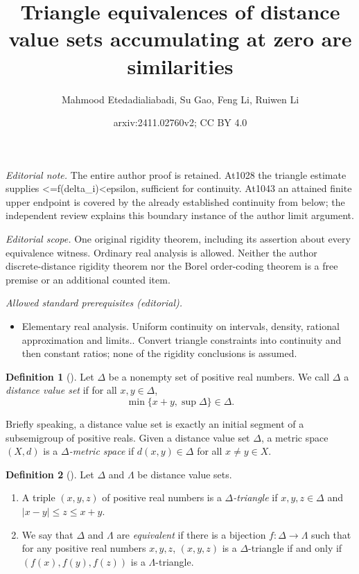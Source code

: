 \documentclass[10pt,a4paper]{amsart}
\title{Triangle equivalences of distance value sets accumulating at zero are similarities}
\author{Mahmood Etedadialiabadi, Su Gao, Feng Li, Ruiwen Li}
\date{arxiv:2411.02760v2; CC BY 4.0}
\theoremstyle{definition}
\newtheorem{definition}{Definition}[section]
\theoremstyle{remark}
\begin{document}
\maketitle
\noindent\textit{Editorial note.} The entire author proof is retained. At1028 the triangle estimate supplies <=f(delta\_i)<epsilon, sufficient for continuity. At1043 an attained finite upper endpoint is covered by the already established continuity from below; the independent review explains this boundary instance of the author limit argument.\par\medskip
\noindent\textit{Editorial scope.} One original rigidity theorem, including its assertion about every equivalence witness. Ordinary real analysis is allowed. Neither the author discrete-distance rigidity theorem nor the Borel order-coding theorem is a free premise or an additional counted item.\par\medskip
\noindent\textit{Allowed standard prerequisites (editorial).}\begin{itemize}
\item Elementary real analysis. Uniform continuity on intervals, density, rational approximation and limits.. Convert triangle constraints into continuity and then constant ratios; none of the rigidity conclusions is assumed.
\end{itemize}\medskip
    \begin{definition}[\cite{EGLMM}]
        Let $\Delta$ be a nonempty set of positive real numbers. We call $\Delta$ a {\em distance value set} if for all $x, y\in \Delta$, 
        \begin{equation*}
           \min\{ x+y, \sup\Delta\} \in \Delta.
        \end{equation*}
    \end{definition}
Briefly speaking, a distance value set is exactly an initial segment of a subsemigroup of positive reals. Given a distance value set $\Delta$, a metric space $(X,d)$ is a {\em $\Delta$-metric space} if $d(x,y)\in\Delta$ for all $x\neq y\in X$. 

\begin{definition}[\cite{EGLMM}]\label{def:CDVSequiv} Let $\Delta$ and $\Lambda$ be distance value sets. 
\begin{enumerate}
\item[(i)] A triple $(x,y,z)$ of positive real numbers is a {\em $\Delta$-triangle} if $x,y, z\in \Delta$ and $|x-y|\leq z\leq x+y$.
\item[(ii)] We say that $\Delta$ and $\Lambda$ are {\em equivalent} if there is a bijection $f\colon \Delta\to \Lambda$ such that for any positive real numbers $x,y, z$, $(x,y,z)$ is a $\Delta$-triangle if and only if $(f(x), f(y), f(z))$ is a $\Lambda$-triangle.
\end{enumerate}
\end{definition}
\end{document}

